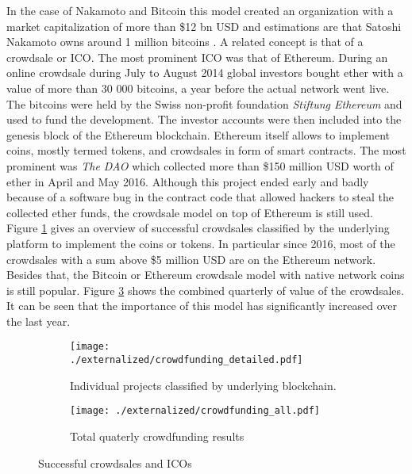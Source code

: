 In the case of Nakamoto and Bitcoin this model created an organization with a market capitalization of more than \$12 bn USD and estimations are that Satoshi Nakamoto owns around 1 million bitcoins \parencite{Lerner2016}. A related concept is that of a crowdsale or \ac{ICO}. The most prominent \ac{ICO} was that of Ethereum. During an online crowdsale during July to August 2014 global investors bought ether with a value of more than 30 000 bitcoins, a year before the actual network went live. The bitcoins were held by the Swiss non-profit foundation \emph{Stiftung Ethereum} and used to fund the development. The investor accounts were then included into the genesis block of the Ethereum blockchain. Ethereum itself allows to implement coins, mostly termed tokens, and crowdsales in form of smart contracts. The most prominent was \emph{The DAO} which collected more than \$150 million USD worth of ether in April and May 2016. Although this project ended early and badly because of a software bug in the contract code that allowed hackers to steal the collected ether funds, the crowdsale model on top of Ethereum is still used. Figure \ref{fig:eco:crowdfunding_detailed} gives an overview of successful crowdsales classified by the underlying platform to implement the coins or tokens. In particular since 2016, most of the crowdsales with a sum above \$5 million USD are on the Ethereum network. Besides that, the Bitcoin or Ethereum crowdsale model with native network coins is still popular. Figure \ref{fig:eco:crowdfunding_all} shows the combined quarterly of value of the crowdsales. It can be seen that the importance of this model has significantly increased over the last year. 

\begin{figure}[ht]
  \centering
  \begin{subfigure}[t]{0.5\linewidth}
    \centering\texttt{[image: ./externalized/crowdfunding\_detailed.pdf]}
    \caption{Individual projects classified by underlying blockchain.}
    \label{fig:eco:crowdfunding_detailed}
  \end{subfigure}%
  \begin{subfigure}[t]{0.5\linewidth}
    \centering\texttt{[image: ./externalized/crowdfunding\_all.pdf]}
    \caption{Total quaterly crowdfunding results}
    \label{fig:eco:crowdfunding_all}
  \end{subfigure}
  \caption{Successful crowdsales and \ac{ICO}s}
\end{figure}

